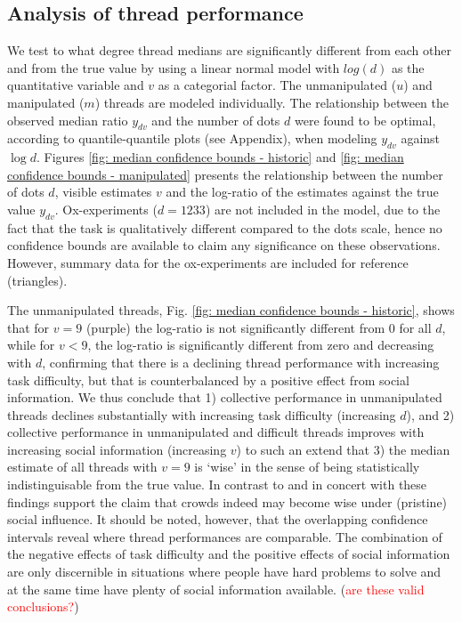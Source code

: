 \documentclass[9pt,twocolumn,twoside,lineno]{pnas-new}
\begin{document}
\subsection*{Analysis of thread performance}
We test to what degree thread medians are significantly different from each other and from the true value by using a linear normal model with $log(d)$ as the quantitative variable and $v$ as a categorial factor. The unmanipulated ($u$) and manipulated ($m$) threads are modeled individually. The relationship between the observed median ratio $y_{dv}$ and the number of dots $d$ were found to be optimal, according to quantile-quantile plots (see Appendix), when modeling $y_{dv}$ against $\log{d}$. Figures \ref{fig: median confidence bounds - historic} and \ref{fig: median confidence bounds - manipulated} presents the relationship between the number of dots $d$, visible estimates $v$ and the log-ratio of the estimates against the true value $y_{dv}$. Ox-experiments ($d=1233$) are not included in the model, due to the fact that the task is qualitatively different compared to the dots scale, hence no confidence bounds are available to claim any significance on these observations. However, summary data for the ox-experiments are included for reference (triangles).

The unmanipulated threads, Fig. \ref{fig: median confidence bounds - historic}, shows that for $v=9$ (purple) the log-ratio is not significantly different from 0 for all $d$, while for $v<9$, the log-ratio is significantly different from zero and decreasing with $d$, confirming that there is a declining thread performance with increasing task difficulty, but that is counterbalanced by a positive effect from social information. We thus conclude that 1) collective performance in unmanipulated threads declines substantially with increasing task difficulty (increasing $d$), and 2) collective performance in unmanipulated and difficult threads improves with increasing social information (increasing $v$) to such an extend that 3) the median estimate of all threads with $v=9$ is `wise' in the sense of being statistically indistinguisable from the true value. In contrast to \cite{lorenz2011social, king2011true, minson2012cost} and in concert with \cite{gurccay2015power, becker2017network, jayles2017social, farrell2011social} these findings support the claim that crowds indeed may become wise under (pristine) social influence. It should be noted, however, that the overlapping confidence intervals reveal where thread performances are comparable. The combination of the negative effects of task difficulty and the positive effects of social information are only discernible in situations where people have hard problems to solve and at the same time have plenty of social information available. (\textcolor{red}{are these valid conclusions?})
\end{document}
